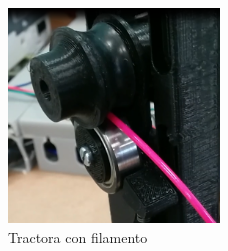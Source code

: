 \begin{figure}[H]
    \centering
    \includegraphics[width=0.5\textwidth]{images/producciones/tractora/final.png}
    \caption{Tractora con filamento}
    \label{fig:tractora_fila}
\end{figure}
